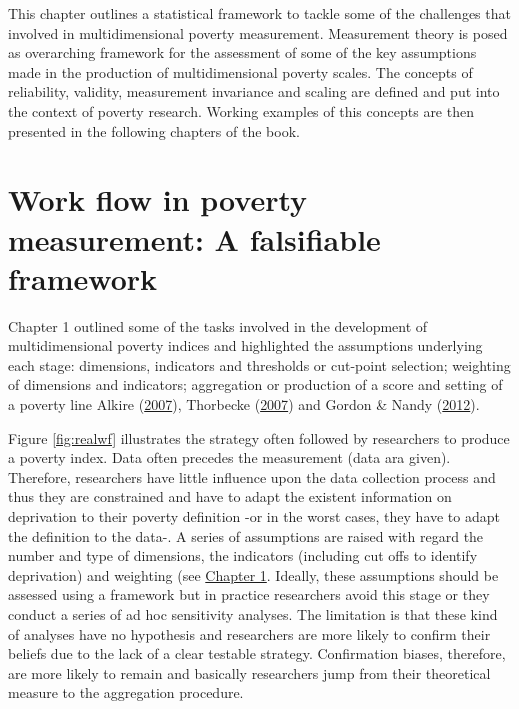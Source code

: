 \documentclass[]{book}
\begin{document}
This chapter outlines a statistical framework to tackle some of the challenges that involved in multidimensional poverty measurement. Measurement theory is posed as overarching framework for the assessment of some of the key assumptions made in the production of multidimensional poverty scales. The concepts of reliability, validity, measurement invariance and scaling are defined and put into the context of poverty research. Working examples of this concepts are then presented in the following chapters of the book.

\hypertarget{work-flow-in-poverty-measurement-a-falsifiable-framework}{%
\section{Work flow in poverty measurement: A falsifiable framework}\label{work-flow-in-poverty-measurement-a-falsifiable-framework}}

Chapter 1 outlined some of the tasks involved in the development of multidimensional poverty indices and highlighted the assumptions underlying each stage: dimensions, indicators and thresholds or cut-point selection; weighting of dimensions and indicators; aggregation or production of a score and setting of a poverty line Alkire (\protect\hyperlink{ref-Alkire2007}{2007}), Thorbecke (\protect\hyperlink{ref-Thorbecke2007}{2007}) and Gordon \& Nandy (\protect\hyperlink{ref-Gordon2012}{2012}).

Figure \ref{fig:realwf} illustrates the strategy often followed by researchers to produce a poverty index. Data often precedes the measurement (data ara given). Therefore, researchers have little influence upon the data collection process and thus they are constrained and have to adapt the existent information on deprivation to their poverty definition -or in the worst cases, they have to adapt the definition to the data-. A series of assumptions are raised with regard the number and type of dimensions, the indicators (including cut offs to identify deprivation) and weighting (see \protect\hyperlink{Chapter-1}{Chapter 1}. Ideally, these assumptions should be assessed using a framework but in practice researchers avoid this stage or they conduct a series of ad hoc sensitivity analyses. The limitation is that these kind of analyses have no hypothesis and researchers are more likely to confirm their beliefs due to the lack of a clear testable strategy. Confirmation biases, therefore, are more likely to remain and basically researchers jump from their theoretical measure to the aggregation procedure.
\end{document}
